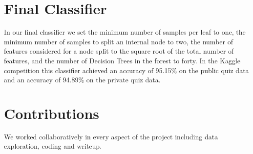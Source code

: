 \documentclass[twoside,11pt]{homework}
\begin{document}


\section*{Final Classifier}

In our final classifier we set the minimum number of samples per leaf to one, the minimum number of samples to split an internal
node to two, the number of features considered for a node split to the square root of the total number of features,
and the number of Decision Trees in the forest to forty. In the Kaggle competition this classifier achieved an accuracy of 95.15\%
on the public quiz data and an accuracy of 94.89\% on the private quiz data.

\section*{Contributions}
We worked collaboratively in every aspect of the project including data exploration, coding and writeup. 
\end{document}
